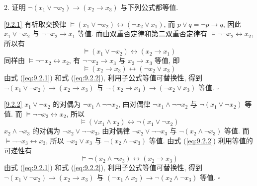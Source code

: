 \documentclass[boxes]{homework}
\begin{document}
\begin{problem}
2. 证明 $\lnot (x_1\lor \lnot x_2)\to (x_2\to x_3)$ 与下列公式都等值.
\end{problem}
\begin{solution}
    \ref{9.2.1} 有析取交换律 $\vDash (x_1\lor \lnot x_2)\leftrightarrow(\lnot x_2\lor x_1)$, 而 $p\lor q = \lnot p\to q$, 因此 $x_1\lor \lnot x_2$ 与 $\lnot\lnot x_2\to x_1$ 等值. 而由双重否定律和第二双重否定律有 $\vDash \lnot\lnot x_2\leftrightarrow x_2$, 所以有
    \begin{equation}\label{eq:9.2.1}
        \vDash (x_1\lor \lnot x_2)\leftrightarrow(x_2\to x_1)
    \end{equation}
    同样由 $\vDash \lnot\lnot x_2\leftrightarrow x_2$, 有 $\lnot\lnot x_2\to x_3$ 与 $x_2\to x_3$ 等值, 即
    \begin{equation}\label{eq:9.2.2}
        \vDash (x_2\to x_3)\leftrightarrow(\lnot x_2\lor x_3)
    \end{equation}
    由式 (\ref{eq:9.2.1}) 和式 (\ref{eq:9.2.2}), 利用子公式等值可替换性, 得到 $\lnot(x_1\lor\lnot x_2)\to(x_2\to x_3)$ 与 $\lnot (x_2\to x_1)\to (\lnot x_2\lor x_3)$ 等值. $\square$

    \ref{9.2.2} $x_1\lor \lnot x_2$ 的对偶为 $\lnot x_1\land \lnot\lnot x_2$, 由对偶律 $\lnot x_1\land \lnot\lnot x_2$ 与 $\lnot(x_1\lor\lnot x_2)$ 等值. 而 $\vDash \lnot\lnot x_2\leftrightarrow x_2$, 所以
    \begin{equation}\label{eq:9.2.3}
        \vDash (\lor x_1\land x_2)\leftrightarrow\lnot(x_1\lor\lnot x_2)
    \end{equation}
    $x_2\land\lnot x_3$ 的对偶为 $\lnot x_2\lor \lnot\lnot x_3$, 由对偶律 $\lnot x_2\lor \lnot\lnot x_3$ 与 $\lnot(x_2\land\lnot x_3)$ 等值. 而 $\vDash \lnot\lnot x_3\leftrightarrow x_3$, 所以 $\lnot x_2\lor x_3$ 与 $\lnot(x_2\land\lnot x_3)$ 等值. 由式 (\ref{eq:9.2.2}) 利用等值的可递性有
    \begin{equation}\label{eq:9.2.4}
        \vDash \lnot(x_2\land \lnot x_3)\leftrightarrow(x_2\to x_3)
    \end{equation}
    由式 (\ref{eq:9.2.1}) 和式 (\ref{eq:9.2.2}), 利用子公式等值可替换性, 得到 $\lnot(x_1\lor\lnot x_2)\to(x_2\to x_3)$ 与 $(\lnot x_1\land x_2)\to \lnot (x_2\land\lnot x_3)$ 等值. $\square$
\end{solution}
\end{document}
